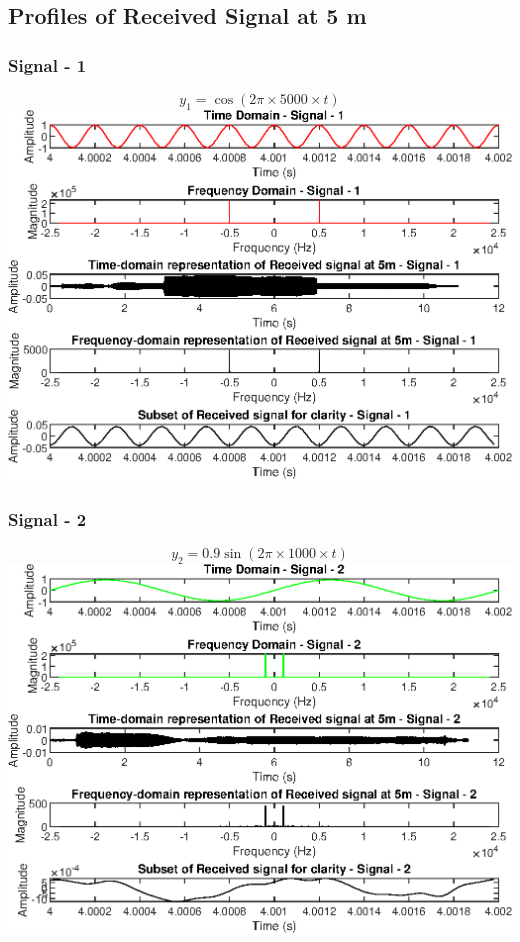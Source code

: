\documentclass{report}
\begin{document}
\newpage
\subsection{Profiles of Received Signal at 5 m }


\subsubsection{Signal - 1}

$$ y_1 = \cos(2\pi \times 5000 \times t) $$
\includegraphics[width=1.1\linewidth]{5_1.eps}

\newpage
\subsubsection{Signal - 2}

$$ y_2 = 0.9 \sin(2\pi \times 1000 \times t) $$
\includegraphics[width=1.1\linewidth]{5_2.eps}
\end{document}
